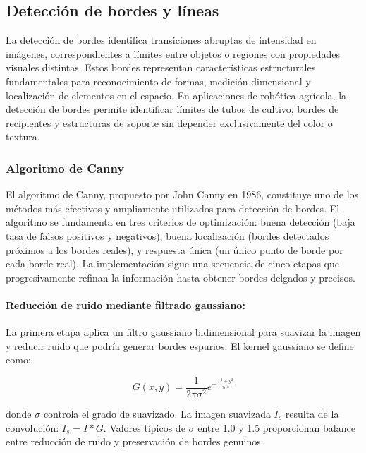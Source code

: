 \subsection{Detección de bordes y líneas}

La detección de bordes identifica transiciones abruptas de intensidad en imágenes, correspondientes a límites entre objetos o regiones con propiedades visuales distintas. Estos bordes representan características estructurales fundamentales para reconocimiento de formas, medición dimensional y localización de elementos en el espacio. En aplicaciones de robótica agrícola, la detección de bordes permite identificar límites de tubos de cultivo, bordes de recipientes y estructuras de soporte sin depender exclusivamente del color o textura.

\subsubsection{Algoritmo de Canny}

El algoritmo de Canny, propuesto por John Canny en 1986, constituye uno de los métodos más efectivos y ampliamente utilizados para detección de bordes. El algoritmo se fundamenta en tres criterios de optimización: buena detección (baja tasa de falsos positivos y negativos), buena localización (bordes detectados próximos a los bordes reales), y respuesta única (un único punto de borde por cada borde real). La implementación sigue una secuencia de cinco etapas que progresivamente refinan la información hasta obtener bordes delgados y precisos.

\paragraph{\underline{Reducción de ruido mediante filtrado gaussiano:}}

La primera etapa aplica un filtro gaussiano bidimensional para suavizar la imagen y reducir ruido que podría generar bordes espurios. El kernel gaussiano se define como:

\begin{equation}
G(x,y) = \frac{1}{2\pi\sigma^2} e^{-\frac{x^2 + y^2}{2\sigma^2}}
\end{equation}

donde $\sigma$ controla el grado de suavizado. La imagen suavizada $I_s$ resulta de la convolución: $I_s = I \ast G$. Valores típicos de $\sigma$ entre 1.0 y 1.5 proporcionan balance entre reducción de ruido y preservación de bordes genuinos.

